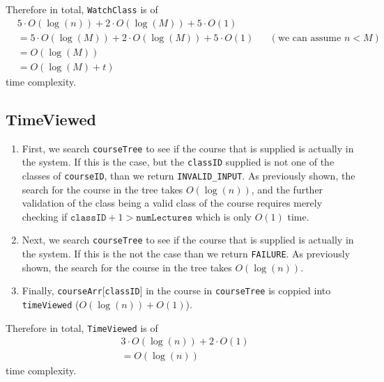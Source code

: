 \documentclass{article}
\begin{document}
    Therefore in total, \texttt{WatchClass} is of 
     \begin{align*}
         &5\cdot O(\log(n))+2\cdot O(\log(M))+5\cdot O(1)\\
         &=5\cdot O(\log(M))+2\cdot O(\log(M))+5\cdot O(1) && (\text{we can assume } n < M)\\
         &=O(\log(M))\\
         &=O(\log(M)+t)
     \end{align*}
     time complexity.
    \subsection*{TimeViewed}
        \begin{enumerate}
            \item First, we search \texttt{courseTree} to see if the course that is supplied 
                is actually in the system. If this is the case, but the \texttt{classID} supplied
                is not one of the classes of \texttt{courseID}, than we return \texttt{INVALID\_INPUT}.
                As previously shown, the search for the course in the tree takes $O(\log(n))$, and the further
                validation of the class being a valid class of the course requires merely checking if 
                $\texttt{classID}+1>\texttt{numLectures}$ which is only $O(1)$ time.
            \item Next, we search \texttt{courseTree} to see if the course that is supplied 
                is actually in the system. If this is the not the case than we return \texttt{FAILURE}.
                As previously shown, the search for the course in the tree takes $O(\log(n))$.
            \item Finally, \texttt{courseArr}[\texttt{classID}] in the course in \texttt{courseTree}
            is coppied into \texttt{timeViewed} ($O(\log(n))+O(1)$).
        \end{enumerate}
    Therefore in total, \texttt{TimeViewed} is of 
     \begin{align*}
         &3\cdot O(\log(n))+2\cdot O(1)\\
         &=O(\log(n))
     \end{align*}
     time complexity.
\end{document}
